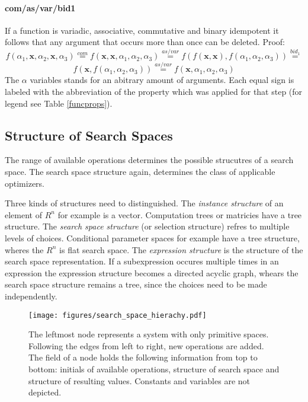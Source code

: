 \documentclass[english]{article}
\begin{document}
\paragraph{com/as/var/bid1}
If a function is variadic, associative, commutative and binary idempotent it follows that any argument that occurs more than once can be deleted. Proof:
$$f(\alpha_1, \mathbf{x}, \alpha_2, \mathbf{x}, \alpha_3) \stackrel{com}{=}
f(\mathbf{x},\mathbf{x}, \alpha_1, \alpha_2, \alpha_3) \stackrel{as/var}{=}
f(f(\mathbf{x},\mathbf{x}), f(\alpha_1, \alpha_2, \alpha_3)) \stackrel{bid_1}{=}$$
$$f(\mathbf{x}, f(\alpha_1, \alpha_2, \alpha_3)) \stackrel{as/var}{=}
f(\mathbf{x}, \alpha_1, \alpha_2, \alpha_3)$$
The $\alpha$ variables stands for an abitrary amount of arguments. Each equal sign is labeled with the abbreviation of the property which was applied for that step (for legend see Table \ref{funcprops}).


\subsection{Structure of Search Spaces}
The range of available operations determines the possible strucutres of a search space. The search space structure again, determines the class of applicable optimizers.

Three kinds of structures need to distinguished. The \textit{instance structure} of an element of $R^n$ for example is a vector. Computation trees or matricies have a tree structure. The \textit{search space structure} (or selection structure) refres to multiple levels of choices. Conditional parameter spaces for example have a tree structure, wheres the $R^n$ is flat search space. The \textit{expression structure} is the structure of the search space representation. If a subexpression occures multiple times in an expression the expression structure becomes a directed acyclic graph, whears the search space structure remains a tree, since the choices need to be made independently.

\begin{figure}[h]
\texttt{[image: figures/search\_space\_hierachy.pdf]}
  \caption{The leftmost node represents a system with only primitive spaces. Following the edges from left to right, new operations are added. The field of a node holds the following information from top to bottom: initials of available operations, structure of search space and structure of resulting values. Constants and variables are not depicted.}
  \label{space_structure}
\end{figure}
\end{document}
